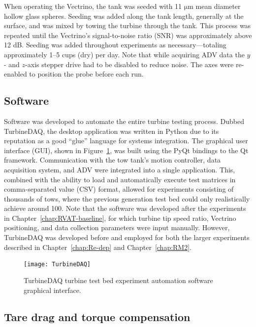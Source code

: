 When operating the Vectrino, the tank was seeded with 11 $\mathrm{\mu}$m mean
diameter hollow glass spheres. Seeding was added along the tank length,
generally at the surface, and was mixed by towing the turbine through the tank.
This process was repeated until the Vectrino's signal-to-noise ratio (SNR) was
approximately above 12 dB. Seeding was added throughout experiments as
necessary---totaling approximately 1--5 cups (dry) per day. Note that while
acquiring ADV data the $y$- and $z$-axis stepper drive had to be disabled to
reduce noise. The axes were re-enabled to position the probe before each run.


\subsection{Software}

Software was developed to automate the entire turbine testing process. Dubbed
TurbineDAQ, the desktop application was written in Python due to its reputation
as a good ``glue'' language for systems integration. The graphical user
interface (GUI), shown in Figure~\ref{fig:TurbineDAQ}, was built using the PyQt
bindings to the Qt framework. Communication with the tow tank's motion
controller, data acquisition system, and ADV were integrated into a single
application. This, combined with the ability to load and automatically execute
test matrices in comma-separated value (CSV) format, allowed for experiments
consisting of thousands of tows, where the previous generation test bed could
only realistically achieve around 100. Note that the software was developed
after the experiments in Chapter~\ref{chap:RVAT-baseline}, for which turbine tip
speed ratio, Vectrino positioning, and data collection parameters were input
manually. However, TurbineDAQ was developed before and employed for both the
larger experiments described in Chapter~\ref{chap:Re-dep} and
Chapter~\ref{chap:RM2}.


\begin{figure}
    \centering

    \texttt{[image: TurbineDAQ]}

    \caption{TurbineDAQ turbine test bed experiment automation software
    graphical interface.}

    \label{fig:TurbineDAQ}
\end{figure}


\subsection{Tare drag and torque compensation}


